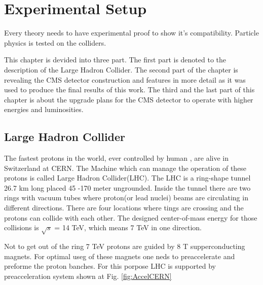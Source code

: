 \chapter{Experimental Setup}
Every theory needs to have experimental proof to show it's compatibility. Particle physics is tested on
the colliders.


This chapter is devided into three part.
The first part is denoted to the description of the Large Hadron Collider. The second part of the 
chapter is revealing the CMS detector construction and features in more detail as it was used to produce the final
results of this work. The third and the last part of this chapter is about the upgrade plans for the
CMS detector to operate with higher energies and luminosities.

\section{Large Hadron Collider}

The fastest protons in the world, ever controlled by human , are alive in Switzerland at CERN.
The Machine which can manage the operation of these protons is called Large Hadron Collider(LHC). 
The LHC is a ring-shape tunnel 26.7 km long  placed 45 -170 meter ungrounded. 
Inside the tunnel there are two rings with vacuum tubes where proton(or lead nuclei) beams are circulating in different directions.
There are four locations where tings are crossing and the protons can collide with each other. 
The designed center-of-mass energy for those collisions is $\sqrt{s}$ = 14 TeV, which means 7 TeV in one direction.


Not to get out of the ring 7 TeV protons are guided by 8 T supperconducting magnets. 
For optimal useg of these magnets one neds to preaccelerate and preforme the proton banches.
For this porpose LHC is supported by preacceleration system shown at Fig. \ref{fig:AccelCERN}


